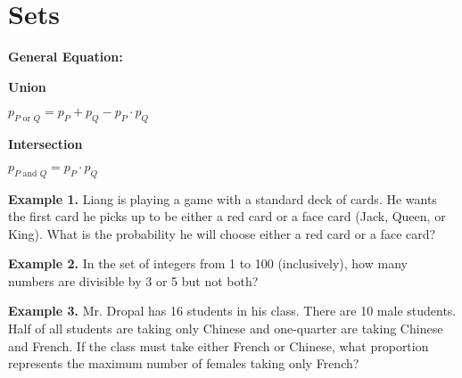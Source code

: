 \section{Sets}

\bigskip
\textbf{General Equation:}

\begin{center}
\setlength{\columnseprule}{0pt}
\begin{multicols}{2}
\textbf{\large Union}

$p_{P\mbox{ or }Q} = p_P+p_Q-p_P\cdot p_Q$

\textbf{\large Intersection}

$p_{P\mbox{ and }Q} = p_P\cdot p_Q$
\end{multicols}
\end{center}

\vfill
\textbf{Example 1.} Liang is playing a game with a standard deck of cards. He wants the first card he picks up to be either a red card or a face card (Jack, Queen, or King). What is the probability he will choose either a red card or a face card?

\vfill
\textbf{Example 2.} In the set of integers from 1 to 100 (inclusively), how many numbers are divisible by 3 or 5 but not both?

\vfill
\textbf{Example 3.} Mr. Dropal has 16 students in his class. There are 10 male students. Half of all students are taking only Chinese and one-quarter are taking Chinese and French. If the class must take either French or Chinese, what proportion represents the maximum number of females taking only French?

